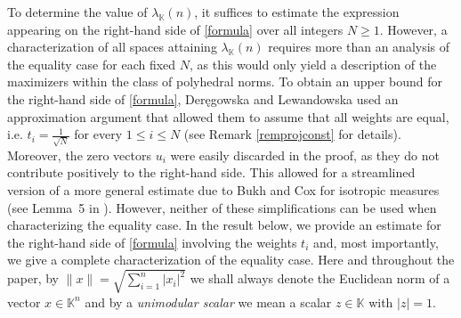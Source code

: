 \documentclass[12pt, reqno]{amsart}
\theoremstyle{definition}
\theoremstyle{remark}
\numberwithin{equation}{section}
\begin{document}
To determine the value of $\lambda_{\mathbb{K}}(n)$, it suffices to estimate the expression appearing on the right-hand side of \eqref{formula} over all integers $N \geq 1$. However, a characterization of all spaces attaining $\lambda_{\mathbb{K}}(n)$ requires more than an analysis of the equality case for each fixed $N$, as this would only yield a description of the maximizers within the class of polyhedral norms. To obtain an upper bound for the right-hand side of \eqref{formula}, Deręgowska and Lewandowska used an approximation argument that allowed them to assume that all weights are equal, i.e. $t_i = \frac{1}{\sqrt{N}}$ for every $1 \leq i \leq N$ (see Remark \ref{remprojconst} for details). Moreover, the zero vectors $u_i$ were easily discarded in the proof, as they do not contribute positively to the right-hand side. This allowed for a streamlined version of a more general estimate due to Bukh and Cox \cite{bukhcox} for isotropic measures (see Lemma~5 in \cite{bukhcox}). However, neither of these simplifications can be used when characterizing the equality case. In the result below, we provide an estimate for the right-hand side of \eqref{formula} involving the weights $t_i$ and, most importantly, we give a complete characterization of the equality case. Here and throughout the paper, by $\|x\|=\sqrt{\sum_{i=1}^{n} |x_i|^2}$ we shall always denote the Euclidean norm of a vector $x \in \mathbb{K}^n$ and by a \emph{unimodular scalar} we mean a scalar $z \in \mathbb{K}$ with $|z|=1$.
\end{document}
